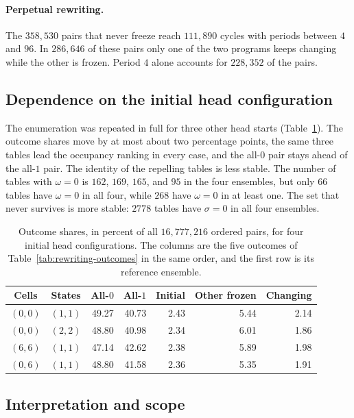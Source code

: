 \documentclass{article}
\begin{document}
\paragraph{Perpetual rewriting.}
The $358{,}530$ pairs that never freeze reach $111{,}890$ cycles with
periods between $4$ and $96$.  In $286{,}646$ of these pairs only one of
the two programs keeps changing while the other is frozen.  Period $4$
alone accounts for $228{,}352$ of the pairs.

\subsection{Dependence on the initial head configuration}

The enumeration was repeated in full for three other head starts
(Table~\ref{tab:rewriting-head-starts}).  The outcome shares move by at
most about two percentage points, the same three tables lead the
occupancy ranking in every case, and the all-$0$ pair stays ahead of the
all-$1$ pair.  The identity of the repelling tables is less stable.  The
number of tables with $\omega=0$ is $162$, $169$, $165$, and $95$ in the
four ensembles, but only $66$ tables have $\omega=0$ in all four, while
$268$ have $\omega=0$ in at least one.  The set that never survives is
more stable: $2778$ tables have $\sigma=0$ in all four ensembles.

\begin{table}[h]
\centering
\caption{Outcome shares, in percent of all $16{,}777{,}216$ ordered pairs,
for four initial head configurations.  The columns are the five outcomes
of Table~\ref{tab:rewriting-outcomes} in the same order, and the first row
is its reference ensemble.}
\label{tab:rewriting-head-starts}
\begin{tabular}{ccrrrrr}
\toprule
Cells & States & All-$0$ & All-$1$ & Initial & Other frozen & Changing \\
\midrule
$(0,0)$ & $(1,1)$ & 49.27 & 40.73 & 2.43 & 5.44 & 2.14 \\
$(0,0)$ & $(2,2)$ & 48.80 & 40.98 & 2.34 & 6.01 & 1.86 \\
$(6,6)$ & $(1,1)$ & 47.14 & 42.62 & 2.38 & 5.89 & 1.98 \\
$(0,6)$ & $(1,1)$ & 48.80 & 41.58 & 2.36 & 5.35 & 1.91 \\
\bottomrule
\end{tabular}
\end{table}

\subsection{Interpretation and scope}
\end{document}
